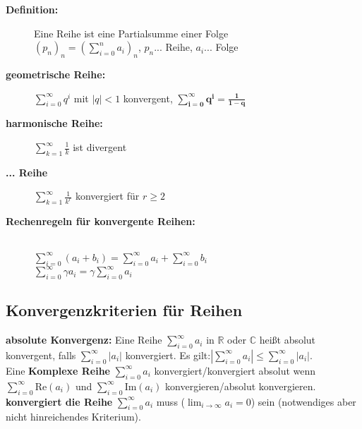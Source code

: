 \begin{description}
    \item[\textbf{Definition:}] Eine Reihe ist eine Partialsumme einer Folge\\
    $(p_n)_n = \left(\sum\limits_{i=0}^{n}a_i \right)_n$, $p_n$... Reihe, $a_i$... Folge\\

    \item [\textbf{geometrische Reihe:}] $\sum\limits_{i=0}^{\infty} q^i$ mit $|q|<1$ konvergent, $\bm{\sum\limits_{i=0}^{\infty} q^i = \frac{1}{1-q}}$
    \item[\textbf{harmonische Reihe:}] $\sum\limits_{k=1}^{\infty}\frac{1}{k}$ ist divergent\\
    \item[\textbf{... Reihe}] $\sum\limits_{k=1}^{\infty}\frac{1}{k^r}$ konvergiert für $r\geq 2$\\
    \item[\textbf{Rechenregeln für konvergente Reihen:}]\ \\
    $\sum\limits_{i=0}^{\infty}(a_i+b_i) = \sum\limits_{i=0}^{\infty}a_i + \sum\limits_{i=0}^{\infty} b_i$\\

    $\sum\limits_{i=0}^{\infty}\gamma a_i = \gamma \sum\limits_{i=0}^{\infty} a_i$\\          
\end{description}



\subsection{Konvergenzkriterien für Reihen}

\textbf{absolute Konvergenz:} Eine Reihe $\sum_{i=0}^{\infty}a_i$ in $\mathbb{R}$ oder $\mathbb{C}$ heißt absolut konvergent, falls $\sum_{i=0}^{\infty}|a_i|$ konvergiert. Es gilt:$|\sum_{i=0}^{\infty}a_i| \leq \sum_{i=0}^{\infty}|a_i|$.\\

Eine \textbf{Komplexe Reihe} $\sum_{i=0}^{\infty}a_i$ konvergiert/konvergiert absolut wenn $\sum_{i=0}^{\infty}\text{Re}(a_i)$ und $\sum_{i=0}^{\infty}\text{Im}(a_i)$ konvergieren/absolut konvergieren.\\

\textbf{konvergiert die Reihe} $\sum_{i=0}^{\infty}a_i$ muss ($\lim_{i\to\infty}a_i = 0$) sein (notwendiges aber nicht hinreichendes Kriterium).\\

